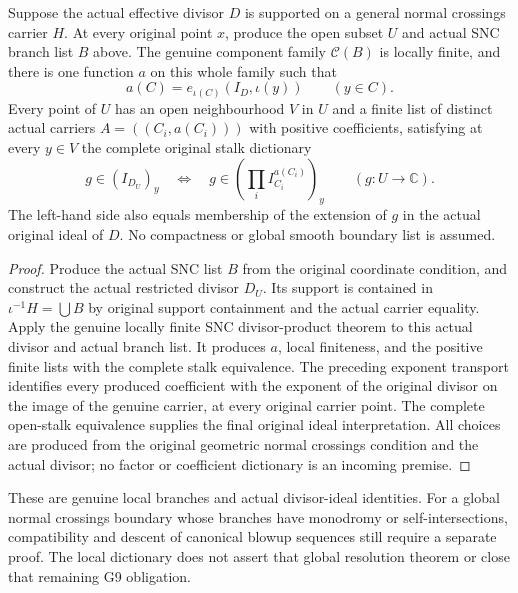\begin{theorem}
\label{hir:general-nc-original-divisor-local-product-dictionary}
\leanok
Suppose the actual effective divisor $D$ is supported on a general
normal crossings carrier $H$.  At every original point $x$, produce
the open subset $U$ and actual SNC branch list $B$ above.  The genuine
component family $\mathcal C(B)$ is locally finite, and there is one
function $a$ on this whole family such that
\[
 a(C)=e_{\iota(C)}(I_D,\iota(y))\qquad(y\in C).
\]
Every point of $U$ has an open neighbourhood $V$ in $U$ and a finite
list of distinct actual carriers $A=((C_i,a(C_i)))$ with positive
coefficients, satisfying at every $y\in V$ the complete original
stalk dictionary
\[
 g\in(I_{D_U})_y
 \quad\Longleftrightarrow\quad
 g\in\left(\prod_i I_{C_i}^{a(C_i)}\right)_y
 \qquad(g:U\to\mathbb C).
\]
The left-hand side also equals membership of the extension of $g$
in the actual original ideal of $D$.  No compactness or global smooth
boundary list is assumed.
\end{theorem}
\begin{proof}
Produce the actual SNC list $B$ from the original coordinate condition,
and construct the actual restricted divisor $D_U$.
Its support is contained in $\iota^{-1}H=\bigcup B$ by original support
containment and the actual carrier equality.  Apply the genuine locally
finite SNC divisor-product theorem to this actual divisor and actual
branch list.  It produces $a$, local finiteness, and the positive finite
lists with the complete stalk equivalence.  The preceding exponent
transport identifies every produced coefficient with the exponent of
the original divisor on the image of the genuine carrier, at every
original carrier point.  The complete open-stalk equivalence supplies
the final original ideal interpretation.  All choices are produced
from the original geometric normal crossings condition and the actual
divisor; no factor or coefficient dictionary is an incoming premise.
\end{proof}

These are genuine local branches and actual divisor-ideal identities.
For a global normal crossings boundary whose branches have monodromy
or self-intersections, compatibility and descent of canonical blowup
sequences still require a separate proof.  The local dictionary does
not assert that global resolution theorem or close that remaining G9
obligation.
